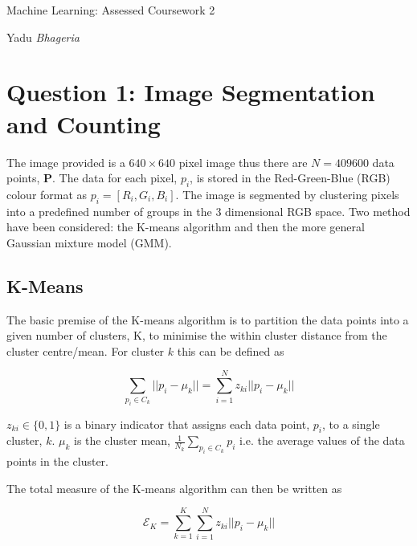 \documentclass{article}
\begin{document}
\lstset{language=Matlab}
\begin{center}
    
    {\huge Machine Learning: Assessed Coursework 2}\\
    \vspace{0.5cm}
    
    {\LARGE Yadu \emph{Bhageria}}\\
    \vspace{0.2cm}
    
\end{center}

\section{Question 1: Image Segmentation and Counting}

The image provided is a $640 \times 640$ pixel image thus there are $N=409600$ data points, \textbf{P}. The data for each pixel, $p_i$, is stored in the Red-Green-Blue (RGB) colour format as $p_i = [R_i, G_i, B_i]$. The image is segmented by clustering pixels into a predefined number of groups in the 3 dimensional RGB space. Two method have been considered: the K-means algorithm and then the more general Gaussian mixture model (GMM).

\subsection{K-Means}
The basic premise of the K-means algorithm is to partition the data points into a given number of clusters, K, to minimise the within cluster distance from the cluster centre/mean. For cluster $k$ this can be defined as

\begin{equation}
	\sum_{p_i \in C_k} ||p_i - \mu_k|| = \sum_{i=1}^N z_{ki}||p_i - \mu_k||
\end{equation}

$z_{k i} \in \{0,1\}$ is a binary indicator that assigns each data point, $p_i$, to a single cluster, $k$. $\mu_k$ is the cluster mean, $\frac{1}{N_k} \sum_{p_i \in C_k} p_i$ i.e. the average values of the data points in the cluster.

The total measure of the K-means algorithm can then be written as

\begin{equation}
	\mathcal{E}_K = \sum_{k=1}^K \sum_{i=1}^N z_{ki}||p_i - \mu_k||
\end{equation}
\end{document}

